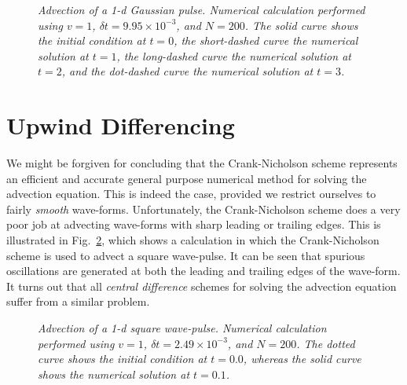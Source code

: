 \begin{figure}
\epsfysize=3in
\centerline{}
\caption{\em Advection of a 1-d Gaussian pulse.
Numerical  calculation performed using
$v=1$, $\delta t = 9.95\times 10^{-3}$, and $N=200$.  The
solid curve shows the initial condition at $t=0$, the short-dashed curve  the numerical solution
at $t=1$, the long-dashed curve  the numerical solution
at $t=2$, and the dot-dashed  curve  the numerical solution at 
$t=3$. }\label{nodisperse}
\end{figure}

\section{Upwind Differencing}\label{supwind}
We might be forgiven for concluding that the Crank-Nicholson scheme represents an
efficient and accurate general purpose numerical method for solving the advection equation.
This is indeed the case, provided we restrict ourselves to fairly {\em smooth} wave-forms.
Unfortunately, the Crank-Nicholson scheme does a very poor
job at advecting wave-forms with sharp leading or trailing edges. This is illustrated in
Fig.~\ref{upwind1}, which shows a calculation in which the  Crank-Nicholson scheme 
is used to advect a square wave-pulse. It can be seen that spurious oscillations are generated
at both the leading and trailing edges of the wave-form. It turns out that all {\em central
difference}  schemes for solving the advection equation suffer from a
similar problem.
\begin{figure}
\epsfysize=3in
\centerline{}
\caption{\em Advection of a 1-d square wave-pulse.
Numerical  calculation performed using
$v=1$, $\delta t = 2.49\times 10^{-3}$, and $N=200$.  The
dotted curve shows the initial condition at $t=0.0$, whereas the solid curve shows the numerical solution
at $t=0.1$.}\label{upwind1}
\end{figure}

